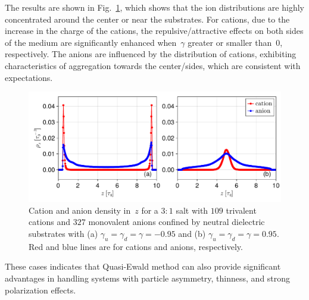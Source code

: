 The results are shown in Fig.~\ref{fig:salt3-1}, which shows that the ion distributions are highly concentrated around the center or near the substrates.
For cations, due to the increase in the charge of the cations, the repulsive/attractive effects on both sides of the medium are significantly enhanced when~$\gamma$ greater or smaller than~$0$, respectively.
The anions are influenced by the distribution of cations, exhibiting characteristics of aggregation towards the center/sides, which are consistent with expectations.

\begin{figure}[htb]
  \centering
  \includegraphics[width = \linewidth]{figs/density_3-1.pdf}

  \caption{
    Cation and anion density in~$z$ for a $3:1$ salt with $109$ trivalent cations and $327$ monovalent anions confined by neutral dielectric substrates with (a) $\gamma_u = \gamma_d = \gamma = - 0.95$ and (b) $\gamma_u = \gamma_d = \gamma = 0.95$.
    Red and blue lines are for cations and anions, respectively.
  }
    \label{fig:salt3-1}
\end{figure}

These cases indicates that Quasi-Ewald method can also provide significant advantages in handling systems with particle asymmetry, thinness, and strong polarization effects.